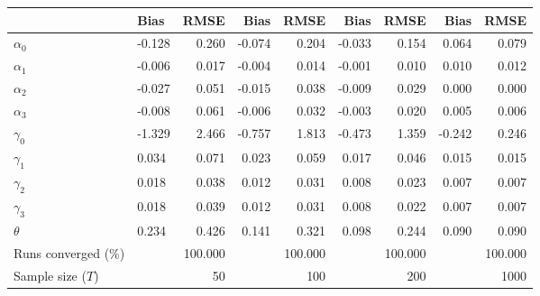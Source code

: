 
\begin{tabular}[t]{llrrrrrrr}
\toprule
  & Bias & RMSE & Bias & RMSE & Bias & RMSE & Bias & RMSE\\
\midrule
$\alpha_{0}$ & -0.128 & 0.260 & -0.074 & 0.204 & -0.033 & 0.154 & 0.064 & 0.079\\
$\alpha_{1}$ & -0.006 & 0.017 & -0.004 & 0.014 & -0.001 & 0.010 & 0.010 & 0.012\\
$\alpha_{2}$ & -0.027 & 0.051 & -0.015 & 0.038 & -0.009 & 0.029 & 0.000 & 0.000\\
$\alpha_{3}$ & -0.008 & 0.061 & -0.006 & 0.032 & -0.003 & 0.020 & 0.005 & 0.006\\
$\gamma_{0}$ & -1.329 & 2.466 & -0.757 & 1.813 & -0.473 & 1.359 & -0.242 & 0.246\\
$\gamma_{1}$ & 0.034 & 0.071 & 0.023 & 0.059 & 0.017 & 0.046 & 0.015 & 0.015\\
$\gamma_{2}$ & 0.018 & 0.038 & 0.012 & 0.031 & 0.008 & 0.023 & 0.007 & 0.007\\
$\gamma_{3}$ & 0.018 & 0.039 & 0.012 & 0.031 & 0.008 & 0.022 & 0.007 & 0.007\\
$\theta$ & 0.234 & 0.426 & 0.141 & 0.321 & 0.098 & 0.244 & 0.090 & 0.090\\
Runs converged (\%) &  & 100.000 &  & 100.000 &  & 100.000 &  & 100.000\\
Sample size ($T$) &  & 50 &  & 100 &  & 200 &  & 1000\\
\bottomrule
\end{tabular}
